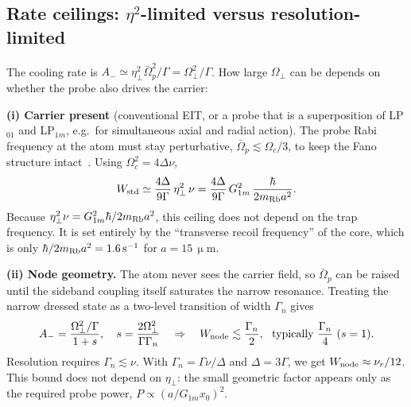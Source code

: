 \documentclass[11pt,a4paper]{article}
\newcommand{\micrometre}{\upmu m}\newcommand{\microkelvin}{\upmu K}
\newcommand{\SI}[2]{\ensuremath{#1\,\mathrm{#2}}}
\newcommand{\Om}{\Omega}
\newcommand{\etaeff}{\eta_{\perp}}
\begin{document}
\subsection{Rate ceilings: $\eta^2$-limited versus resolution-limited}
\label{sec:ceilings}
The cooling rate is $A_-\simeq\etaeff^2\bar\Om_p^2/\Gamma=\Om_\perp^2/\Gamma$. How large $\Om_\perp$ can be depends on whether the probe also drives the carrier:

\textbf{(i) Carrier present} (conventional EIT, or a probe that is a superposition of LP$_{01}$ and LP$_{1m}$, e.g.\ for simultaneous axial and radial action). The probe Rabi frequency at the atom must stay perturbative, $\bar\Om_p\lesssim\Om_c/3$, to keep the Fano structure intact~\cite{morigi2003}. Using $\Om_c^2=4\Delta\nu$,
\begin{equation}
  W_{\rm std}\simeq\frac{4\Delta}{9\Gamma}\,\etaeff^2\,\nu
  =\frac{4\Delta}{9\Gamma}\,G_{1m}^2\,\frac{\hbar}{2m_{\rm Rb}a^2}.
  \label{eq:Wstd}
\end{equation}
Because $\etaeff^2\nu=G_{1m}^2\hbar/2m_{\rm Rb}a^2$, this ceiling does not depend on the trap frequency. It is set entirely by the ``transverse recoil frequency'' of the core, which is only $\hbar/2m_{\rm Rb}a^2=\SI{1.6}{s^{-1}}$ for $a=\SI{15}{\micrometre}$.

\textbf{(ii) Node geometry.} The atom never sees the carrier field, so $\bar\Om_p$ can be raised until the sideband coupling itself saturates the narrow resonance. Treating the narrow dressed state as a two-level transition of width $\Gamma_n$ gives
\begin{equation}
  A_-=\frac{\Om_\perp^2/\Gamma}{1+s},\quad s=\frac{2\Om_\perp^2}{\Gamma\Gamma_n}
  \quad\Rightarrow\quad W_{\rm node}\lesssim\frac{\Gamma_n}{2},\ \text{ typically }\frac{\Gamma_n}{4}\ (s=1).
  \label{eq:Wnode}
\end{equation}
Resolution requires $\Gamma_n\lesssim\nu$. With $\Gamma_n=\Gamma\nu/\Delta$ and $\Delta=3\Gamma$, we get $W_{\rm node}\approx\nu_r/12$. This bound does not depend on $\etaeff$: the small geometric factor appears only as the required probe power, $P\propto(a/G_{1m}x_0)^2$.
\end{document}
